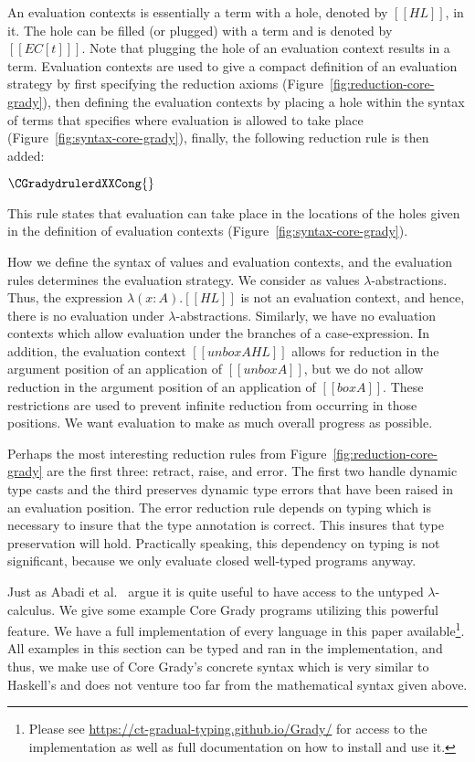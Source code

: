 An evaluation contexts is essentially a term with a hole, denoted by
$[[HL]]$, in it.  The hole can be filled (or plugged) with a term and
is denoted by $[[EC[t] ]]$.  Note that plugging the hole of an
evaluation context results in a term.  Evaluation contexts are used to
give a compact definition of an evaluation strategy by first specifying
the reduction axioms (Figure~\ref{fig:reduction-core-grady}), then
defining the evaluation contexts by placing a hole within the syntax
of terms that specifies where evaluation is allowed to take place
(Figure~\ref{fig:syntax-core-grady}), finally, the following reduction
rule is then added:
\begin{center}\small
  \begin{math}
    \CGradydrulerdXXCong{}
  \end{math}
\end{center}
This rule states that evaluation can take place in the locations of
the holes given in the definition of evaluation contexts
(Figure~\ref{fig:syntax-core-grady}).

How we define the syntax of values and evaluation contexts, and the
evaluation rules determines the evaluation strategy.  We consider as
values $\lambda$-abstractions. Thus, the expression $\lambda
(x:A).[[HL]]$ is not an evaluation context, and hence, there is no
evaluation under $\lambda$-abstractions.  Similarly, we have no
evaluation contexts which allow evaluation under the branches of a
case-expression.  In addition, the evaluation context $[[unbox A HL]]$
allows for reduction in the argument position of an application of
$[[unbox A]]$, but we do not allow reduction in the argument position
of an application of $[[box A]]$. These restrictions are used to
prevent infinite reduction from occurring in those positions.  We want
evaluation to make as much overall progress as possible.

Perhaps the most interesting reduction rules from
Figure~\ref{fig:reduction-core-grady} are the first three: retract,
raise, and error.  The first two handle dynamic type casts and the
third preserves dynamic type errors that have been raised in an
evaluation position.  The error reduction rule depends on typing which
is necessary to insure that the type annotation is correct.  This
insures that type preservation will hold.  Practically speaking, this
dependency on typing is not significant, because we only evaluate
closed well-typed programs anyway.

Just as Abadi et al.~\cite{Abadi:1989} argue it is quite useful to
have access to the untyped $\lambda$-calculus.  We give some example
Core Grady programs utilizing this powerful feature.  We have a full
implementation of every language in this paper
available\footnote{Please see
  \url{https://ct-gradual-typing.github.io/Grady/} for access to the
  implementation as well as full documentation on how to install and
  use it.}.  All examples in this section can be typed and ran in the
implementation, and thus, we make use of Core Grady's concrete syntax
which is very similar to Haskell's and does not venture too far from
the mathematical syntax given above.

